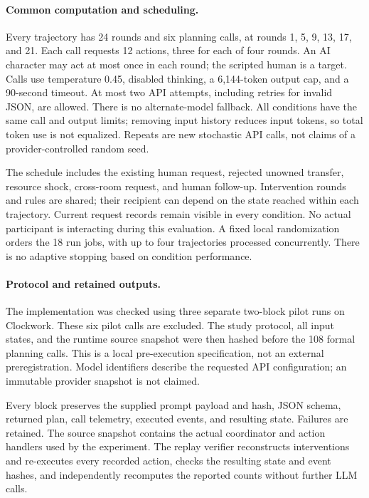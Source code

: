 \paragraph{Common computation and scheduling.}
Every trajectory has 24 rounds and six planning calls, at rounds 1, 5, 9, 13,
17, and 21. Each call requests 12 actions, three for each of four rounds.
An AI character may act at most once in each round; the scripted human is a
target. Calls use temperature 0.45, disabled thinking, a 6,144-token output
cap, and a 90-second timeout. At most two API attempts, including retries for invalid JSON, are allowed.
There is no alternate-model fallback. All conditions have the same call and
output limits; removing input history reduces input tokens, so total token
use is not equalized. Repeats are new stochastic API calls, not claims of a
provider-controlled random seed.

The schedule includes the existing human request, rejected unowned transfer,
resource shock, cross-room request, and human follow-up. Intervention rounds
and rules are shared; their recipient can depend on the state reached within
each trajectory. Current request records remain visible in every condition.
No actual participant is interacting during this evaluation. A fixed local
randomization orders the 18 run jobs, with up to four trajectories processed
concurrently. There is no adaptive stopping based on condition performance.

\paragraph{Protocol and retained outputs.}
The implementation was checked using three separate two-block pilot runs on
Clockwork. These six pilot calls are excluded. The study protocol, all input
states, and the runtime source snapshot were then hashed before the 108 formal
planning calls. This is a local pre-execution specification, not an external
preregistration. Model identifiers describe the requested API configuration;
an immutable provider snapshot is not claimed.

Every block preserves the supplied prompt payload and hash, JSON schema,
returned plan, call telemetry, executed events, and resulting state. Failures
are retained. The source snapshot contains the actual coordinator and action
handlers used by the experiment. The replay verifier reconstructs interventions
and re-executes every recorded action, checks the resulting state and event
hashes, and independently recomputes the reported counts without further LLM
calls.

